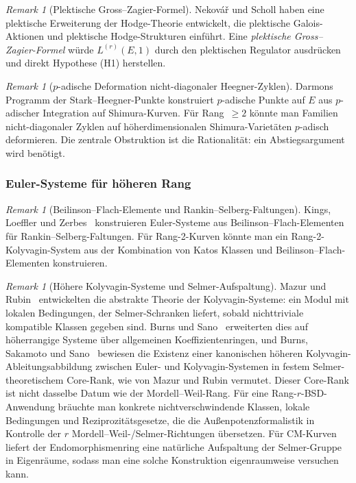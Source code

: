 \documentclass[aps,prd,twocolumn,superscriptaddress,nofootinbib,floatfix]{revtex4-2}
\theoremstyle{definition}
\theoremstyle{remark}
\newtheorem{remark}[theorem]{Remark}
\begin{document}
\begin{remark}[Plektische Gross--Zagier-Formel]
\label{rem:plectic-gz}
Nekovář und Scholl haben eine \glqq plektische\grqq{} Erweiterung der Hodge-Theorie entwickelt, die plektische Galois-Aktionen und plektische Hodge-Strukturen einführt. Eine \textit{plektische Gross--Zagier-Formel} würde $L^{(r)}(E,1)$ durch den plektischen Regulator ausdrücken und direkt Hypothese (H1) herstellen.
\end{remark}

\begin{remark}[$p$-adische Deformation nicht-diagonaler Heegner-Zyklen]
\label{rem:p-adic-deformation}
Darmons Programm der Stark--Heegner-Punkte konstruiert $p$-adische Punkte auf $E$ aus $p$-adischer Integration auf Shimura-Kurven. Für Rang~$\geq 2$ könnte man Familien nicht-diagonaler Zyklen auf höherdimensionalen Shimura-Varietäten $p$-adisch deformieren. Die zentrale Obstruktion ist die Rationalität: ein Abstiegsargument wird benötigt.
\end{remark}

\subsubsection{Euler-Systeme für höheren Rang}

\begin{remark}[Beilinson--Flach-Elemente und Rankin--Selberg-Faltungen]
\label{rem:beilinson-flach}
Kings, Loeffler und Zerbes~\cite{KLZ2017} konstruieren Euler-Systeme aus Beilinson--Flach-Elementen für Rankin--Selberg-Faltungen. Für Rang-2-Kurven könnte man ein \glqq Rang-2-Kolyvagin-System\grqq{} aus der Kombination von Katos Klassen und Beilinson--Flach-Elementen konstruieren.
\end{remark}

\begin{remark}[Höhere Kolyvagin-Systeme und Selmer-Aufspaltung]
\label{rem:kolyvagin-higher}
Mazur und Rubin~\cite{MazurRubin2004} entwickelten die abstrakte Theorie der Kolyvagin-Systeme: ein Modul mit lokalen Bedingungen, der Selmer-Schranken liefert, sobald nichttriviale kompatible Klassen gegeben sind. Burns und Sano~\cite{BurnsSano2021} erweiterten dies auf höherrangige Systeme über allgemeinen Koeffizientenringen, und Burns, Sakamoto und Sano~\cite{BurnsSakamotoSano2025} bewiesen die Existenz einer kanonischen höheren Kolyvagin-Ableitungsabbildung zwischen Euler- und Kolyvagin-Systemen in festem Selmer-theoretischem Core-Rank, wie von Mazur und Rubin vermutet. Dieser Core-Rank ist nicht dasselbe Datum wie der Mordell--Weil-Rang. Für eine Rang-$r$-BSD-Anwendung bräuchte man konkrete nichtverschwindende Klassen, lokale Bedingungen und Reziprozitätsgesetze, die die Außenpotenzformalistik in Kontrolle der $r$ Mordell--Weil-/Selmer-Richtungen übersetzen. Für CM-Kurven liefert der Endomorphismenring eine natürliche Aufspaltung der Selmer-Gruppe in Eigenräume, sodass man eine solche Konstruktion eigenraumweise versuchen kann.
\end{remark}
\end{document}
